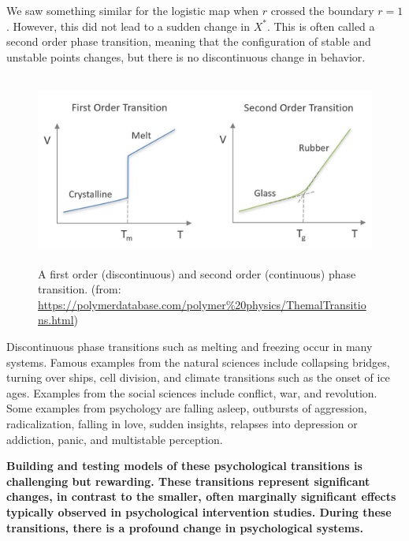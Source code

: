 \documentclass[
  letterpaper,
]{scrbook}
\begin{document}
We saw something similar for the logistic map when \(r\) crossed the
boundary \(r = 1\). However, this did not lead to a sudden change in
\(X^{*}\). This is often called a second order phase transition, meaning
that the configuration of stable and unstable points changes, but there
is no discontinuous change in behavior.

\begin{figure}

{\centering \includegraphics[width=5.17431in,height=2.46528in]{media/ch3/image1.jpg}

}

\caption{\label{fig-ch3-img1-old-13}A first order (discontinuous) and
second order (continuous) phase transition. (from:
\url{https://polymerdatabase.com/polymer\%20physics/ThemalTransitions.html})}

\end{figure}

Discontinuous phase transitions such as melting and freezing occur in
many systems. Famous examples from the natural sciences include
collapsing bridges, turning over ships, cell division, and climate
transitions such as the onset of ice ages. Examples from the social
sciences include conflict, war, and revolution. Some examples from
psychology are falling asleep, outbursts of aggression, radicalization,
falling in love, sudden insights, relapses into depression or addiction,
panic, and multistable perception.

\textbf{Building and testing models of these psychological transitions
is challenging but rewarding. These transitions represent significant
changes, in contrast to the smaller, often marginally significant
effects typically observed in psychological intervention studies. During
these transitions, there is a profound change in psychological systems.}
\end{document}
